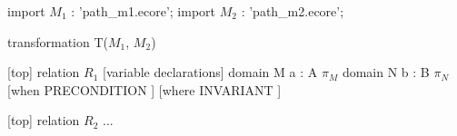 import $M_1$ : 'path_m1.ecore';
import $M_2$ : 'path_m2.ecore';

transformation T($M_1$, $M_2$) {
	[top] relation $R_1$ {
		[variable declarations]
		domain M a : A { $\pi_{M}$ }
		domain N b : B { $\pi_{N}$ }
		[when { PRECONDITION }] [where { INVARIANT }]
	}

	[top] relation $R_2$ { ... }
}